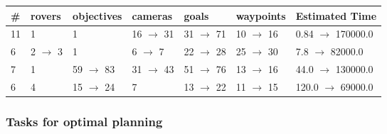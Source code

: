 \documentclass{article}
\begin{document}
                        \begin{center}
                        \begin{tabular}{@{}l|l|l|l|l|l|l@{}}
                        \# & rovers & objectives & cameras & goals & waypoints & Estimated Time\\\midrule
                        11&1&1&16 $\rightarrow$ 31&31 $\rightarrow$ 71&10 $\rightarrow$ 16&0.84 $\rightarrow$ 170000.0\\
6&2 $\rightarrow$ 3&1&6 $\rightarrow$ 7&22 $\rightarrow$ 28&25 $\rightarrow$ 30&7.8 $\rightarrow$ 82000.0\\
7&1&59 $\rightarrow$ 83&31 $\rightarrow$ 43&51 $\rightarrow$ 76&13 $\rightarrow$ 16&44.0 $\rightarrow$ 130000.0\\
6&4&15 $\rightarrow$ 24&7&13 $\rightarrow$ 22&11 $\rightarrow$ 15&120.0 $\rightarrow$ 69000.0
                        \end{tabular}
                        \end{center}
                    
                                \subsubsection*{Tasks for optimal planning}
                                
\end{document}
